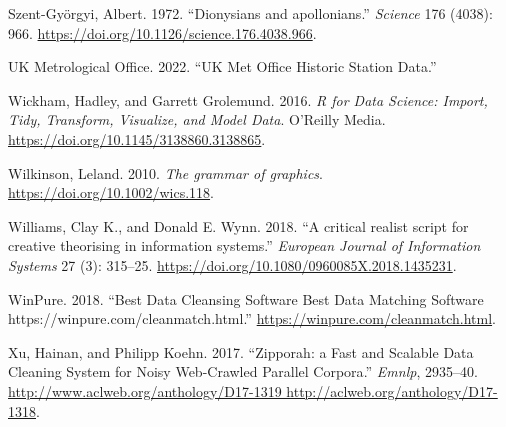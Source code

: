 \documentclass[
]{article}
\newlength{\cslhangindent}
\newlength{\cslentryspacingunit} %
\newenvironment{CSLReferences}[2] %
 {%
  \setlength{\parindent}{0pt}
  \ifodd #1
  \let\oldpar\par
  \def\par{\hangindent=\cslhangindent\oldpar}
  \fi
  \setlength{\parskip}{#2\cslentryspacingunit}
 }%
 {}
\begin{document}
\begin{CSLReferences}{1}{0}
\leavevmode{}%
Szent-Györgyi, Albert. 1972. {``{Dionysians and apollonians}.''}
\emph{Science} 176 (4038): 966.
\url{https://doi.org/10.1126/science.176.4038.966}.

\leavevmode{}%
UK Metrological Office. 2022. {``{UK Met Office Historic Station
Data}.''}

\leavevmode{}%
Wickham, Hadley, and Garrett Grolemund. 2016. \emph{{R for Data Science:
Import, Tidy, Transform, Visualize, and Model Data}}. O'Reilly Media.
\url{https://doi.org/10.1145/3138860.3138865}.

\leavevmode{}%
Wilkinson, Leland. 2010. \emph{{The grammar of graphics}}.
\url{https://doi.org/10.1002/wics.118}.

\leavevmode{}%
Williams, Clay K., and Donald E. Wynn. 2018. {``{A critical realist
script for creative theorising in information systems}.''}
\emph{European Journal of Information Systems} 27 (3): 315--25.
\url{https://doi.org/10.1080/0960085X.2018.1435231}.

\leavevmode{}%
WinPure. 2018. {``{Best Data Cleansing Software \textbar{} Best Data
Matching Software https://winpure.com/cleanmatch.html}.''}
\url{https://winpure.com/cleanmatch.html}.

\leavevmode{}%
Xu, Hainan, and Philipp Koehn. 2017. {``{Zipporah: a Fast and Scalable
Data Cleaning System for Noisy Web-Crawled Parallel Corpora}.''}
\emph{Emnlp}, 2935--40.
\href{http://www.aclweb.org/anthology/D17-1319\%20http://aclweb.org/anthology/D17-1318}{http://www.aclweb.org/anthology/D17-1319
http://aclweb.org/anthology/D17-1318}.

\end{CSLReferences}
\end{document}

